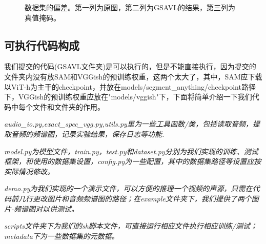 \documentclass[12pt]{article}
\begin{document}
\begin{figure}[!h]
{\begin{minipage}[t]{0.3\linewidth}
  \end{minipage}%
  }%
  \centering
  \caption{数据集的偏差。第一列为原图，第二列为GSAVL的结果，第三列为真值掩码。}
  \label{ref:x3}
\end{figure}

\subsection{可执行代码构成}
我们提交的代码(GSAVL文件夹)是可以执行的，但是不能直接执行，因为提交的文件夹内没有放SAM和VGGish的预训练权重，这两个太大了，其中，SAM应下载以ViT-h为主干的checkpoint，并放在models/segment\_anything/checkpoint路径下，VGGish的预训练权重应放在"models/vggish"下，下面将简单介绍一下我们代码中每个文件和文件夹的作用。

\textit{audio_io.py,exact_spec_vgg.py,utils.py里为一些工具函数/类，包括读取音频，提取音频的频谱图，记录实验结果，保存日志等功能.}

\textit{model.py为模型文件，train.py，test.py和dataset.py分别为我们实现的训练、测试框架，和使用的数据集设置，config.py为一些配置，其中的数据集路径等设置应按实际情况修改。}

\textit{demo.py为我们实现的一个演示文件，可以方便的推理一个视频的声源，只需在代码前几行更改图片和音频频谱图的路径；在example文件夹下，我们提供了两个图片-频谱图对以供测试。}

\textit{scripts文件夹下为我们的sh脚本文件，可直接运行相应文件执行相应训练/测试；metadata下为一些数据集的元数据。}
\end{document}
